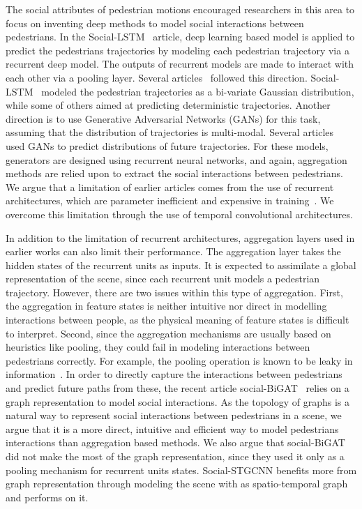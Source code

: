 \documentclass[10pt,twocolumn,letterpaper]{article}
\newcommand*{\ours}{Social-STGCNN }
\begin{document}
The social attributes of pedestrian motions encouraged researchers in this area to focus on inventing deep methods to model social interactions between pedestrians. In the Social-LSTM~\cite{alahi2016social} article, deep learning based model is applied to predict the pedestrians trajectories by modeling each pedestrian trajectory via a recurrent deep model. The outputs of recurrent models are made to interact with each other via a pooling layer. Several articles~\cite{manh2018scene,liang2019peeking,zhang2019sr} followed this direction. Social-LSTM~\cite{alahi2016social} modeled the pedestrian trajectories as a bi-variate Gaussian distribution, while some of others aimed at predicting deterministic trajectories. Another direction is to use Generative Adversarial Networks (GANs) for this task, assuming that the distribution of trajectories is multi-modal. Several articles~\cite{gupta2018social,sadeghian2019sophie,li2019conditional} used GANs to predict distributions of future trajectories. For these models, generators are designed using recurrent neural networks, and again, aggregation methods are relied upon to extract the social interactions between pedestrians. We argue that a limitation of earlier articles comes from the use of recurrent architectures, which are parameter inefficient and expensive in training~\cite{bai2018empirical}. We overcome this limitation through the use of temporal convolutional architectures.

In addition to the limitation of recurrent architectures, aggregation layers used in earlier works can also limit their performance. The aggregation layer takes the hidden states of the recurrent units as inputs. It is expected to assimilate a global representation of the scene, since each recurrent unit models a pedestrian trajectory. However, there are two issues within this type of aggregation. First, the aggregation in feature states is neither intuitive nor direct in modelling interactions between people, as the physical meaning of feature states is difficult to interpret. Second, since the aggregation mechanisms are usually based on heuristics like pooling, they could fail in modeling interactions between pedestrians correctly. For example, the pooling operation is known to be leaky in information~\cite{williams2018wavelet}. In order to directly capture the interactions between pedestrians and predict future paths from these, the recent article social-BiGAT~\cite{kosaraju2019social} relies on a graph representation to model social interactions. As the topology of graphs is a natural way to represent social interactions between pedestrians in a scene, we argue that it is a more direct, intuitive and efficient way to model pedestrians interactions than aggregation based methods. We also argue that social-BiGAT did not make the most of the graph representation, since they used it only as a pooling mechanism for recurrent units states. \ours benefits more from graph representation through modeling the scene with as spatio-temporal graph and performs on it.
\end{document}

